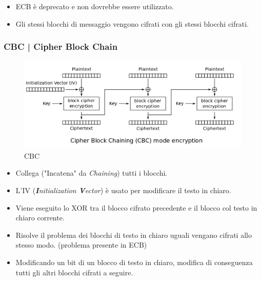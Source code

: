 \begin{itemize}
	\item \textsf{\small ECB è deprecato e non dovrebbe essere utilizzato.}
	\item \textsf{\small Gli stessi blocchi di messaggio vengono cifrati con gli stessi blocchi cifrati.}
\end{itemize}


\subsubsection{CBC | Cipher Block Chain}


\textsf{\small }

\begin{figure}[H]
	\centering
	\includegraphics[width=1\textwidth, height=1\textheight, keepaspectratio]{./images/aes_modes/cbc.png} %
	\caption{CBC}
	\label{fig:cbc}
\end{figure}


\begin{itemize}
	\item \textsf{\small Collega ("Incatena" da \emph{Chaining}) tutti i blocchi.}
	\item \textsf{\small L'IV (\emph{\textbf{I}nitialization \textbf{V}ector}) è usato per modificare il testo in chiaro.}
	\item \textsf{\small Viene eseguito lo XOR tra il blocco cifrato precedente e il blocco col testo in chiaro corrente.}
	\item \textsf{\small Risolve il problema dei blocchi di testo in chiaro uguali vengano cifrati allo stesso modo. (problema presente in ECB)}
	\item \textsf{\small Modificando un bit di un blocco di testo in chiaro, modifica di conseguenza tutti gli altri blocchi cifrati a seguire.}
\end{itemize}

